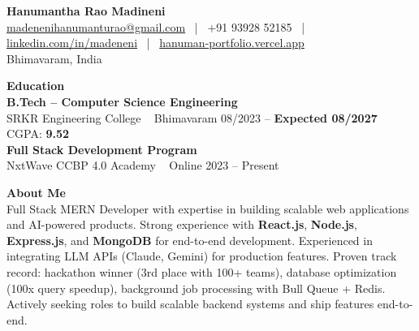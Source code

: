 \documentclass[9pt,a4paper]{article}
\begin{document}
\begin{center}
    {\LARGE \textbf{Hanumantha Rao Madineni}} \\
    \href{mailto:madenenihanumanturao@gmail.com}{madenenihanumanturao@gmail.com} ~|~
    +91 93928 52185 ~|~
    \href{https://www.linkedin.com/in/madeneni}{linkedin.com/in/madeneni} ~|~
    \href{https://hanuman-portfolio.vercel.app}{hanuman-portfolio.vercel.app} \\
    Bhimavaram, India
\end{center}


\begin{tcolorbox}[enhanced,sharp corners,colback=white,boxrule=0pt,frame hidden,
borderline south={0.5pt}{0pt}{black!50}]
\textbf{Education} \\[0.4ex]
\textbf{B.Tech – Computer Science Engineering} \\
SRKR Engineering College \textbullet~ Bhimavaram \hfill 08/2023 -- \textbf{Expected 08/2027} \\
CGPA: \textbf{9.52} \\[0.3ex]

\textbf{Full Stack Development Program} \\
NxtWave CCBP 4.0 Academy \textbullet~ Online \hfill 2023 -- Present
\end{tcolorbox}

\begin{tcolorbox}[enhanced,sharp corners,colback=white,boxrule=0pt,frame hidden,
borderline south={0.5pt}{0pt}{black!50}]
\textbf{About Me} \\[0.5ex]
Full Stack MERN Developer with expertise in building scalable web applications and AI-powered products. 
Strong experience with \textbf{React.js}, \textbf{Node.js}, \textbf{Express.js}, and \textbf{MongoDB} for end-to-end development.
Experienced in integrating LLM APIs (Claude, Gemini) for production features. 
Proven track record: hackathon winner (3rd place with 100+ teams), database optimization (100x query speedup), background job processing with Bull Queue + Redis.
Actively seeking roles to build scalable backend systems and ship features end-to-end.
\end{tcolorbox}
\end{document}
